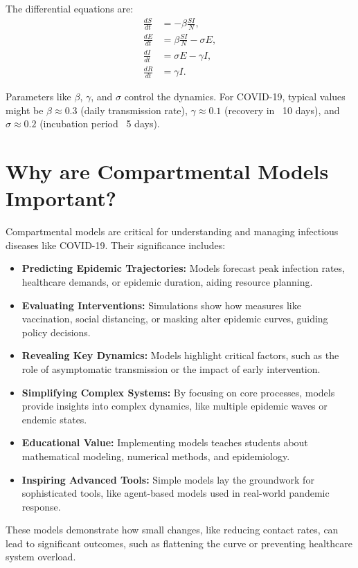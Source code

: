 \documentclass{article}
\begin{document}
The differential equations are:
\begin{align}
    \frac{dS}{dt} &= -\beta \frac{SI}{N}, \\
    \frac{dE}{dt} &= \beta \frac{SI}{N} - \sigma E, \\
    \frac{dI}{dt} &= \sigma E - \gamma I, \\
    \frac{dR}{dt} &= \gamma I.
\end{align}

Parameters like $\beta$, $\gamma$, and $\sigma$ control the dynamics. For COVID-19, typical values might be $\beta \approx 0.3$ (daily transmission rate), $\gamma \approx 0.1$ (recovery in ~10 days), and $\sigma \approx 0.2$ (incubation period ~5 days).

\section{Why are Compartmental Models Important?}

Compartmental models are critical for understanding and managing infectious diseases like COVID-19. Their significance includes:
\begin{itemize}
    \item \textbf{Predicting Epidemic Trajectories:} Models forecast peak infection rates, healthcare demands, or epidemic duration, aiding resource planning.
    \item \textbf{Evaluating Interventions:} Simulations show how measures like vaccination, social distancing, or masking alter epidemic curves, guiding policy decisions.
    \item \textbf{Revealing Key Dynamics:} Models highlight critical factors, such as the role of asymptomatic transmission or the impact of early intervention.
    \item \textbf{Simplifying Complex Systems:} By focusing on core processes, models provide insights into complex dynamics, like multiple epidemic waves or endemic states.
    \item \textbf{Educational Value:} Implementing models teaches students about mathematical modeling, numerical methods, and epidemiology.
    \item \textbf{Inspiring Advanced Tools:} Simple models lay the groundwork for sophisticated tools, like agent-based models used in real-world pandemic response.
\end{itemize}

These models demonstrate how small changes, like reducing contact rates, can lead to significant outcomes, such as flattening the curve or preventing healthcare system overload.
\end{document}
